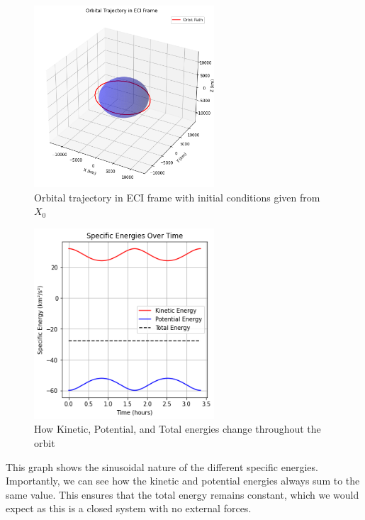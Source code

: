 \documentclass[a4paper, 12pt]{article}  %
\begin{document}
\begin{figure}[H]
    \centering
    \includegraphics[width=0.6\textwidth]{123-3d.png}
    \caption{Orbital trajectory in ECI frame with initial conditions given from $X_0$}
    \label{fig:example}
\end{figure}

\begin{figure}[H]
    \centering
    \includegraphics[width=0.6\textwidth]{124-energies.png}
    \caption{How Kinetic, Potential, and Total energies change throughout the orbit }
    \label{fig:example}
\end{figure}

This graph shows the sinusoidal nature of the different specific energies. Importantly, we can see how the 
kinetic and potential energies always sum to the same value. This ensures that the total energy remains constant, which we would expect 
as this is a closed system with no external forces. 
\end{document}
